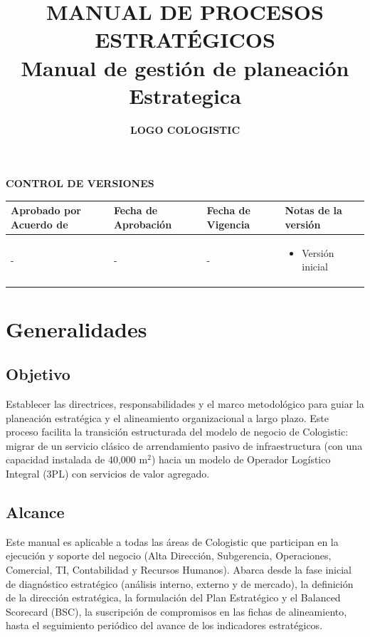 \documentclass[11pt,letterpaper]{report}
\title{\textbf{\large MANUAL DE PROCESOS ESTRATÉGICOS}\\[0.5em] \textbf{\Huge Manual de gestión de planeación Estrategica }}
\author{\textbf{LOGO COLOGISTIC}}
\date{}
\begin{document}
\maketitle

\begin{center}
\textbf{\large CONTROL DE VERSIONES}
\end{center}
\begin{tabularx}{\textwidth}{p{}p{}p{}X}
\toprule
\textbf{Aprobado por Acuerdo de} & \textbf{Fecha de Aprobación} & \textbf{Fecha de Vigencia} & \textbf{Notas de la versión} \\
\midrule
- & - & - & \begin{itemize} \item Versión inicial \end{itemize} \\
\bottomrule
\end{tabularx}

\newpage

\tableofcontents

\newpage

\chapter{Generalidades}

\section{Objetivo}
Establecer las directrices, responsabilidades y el marco metodológico para guiar la planeación estratégica y el alineamiento organizacional a largo plazo. Este proceso facilita la transición estructurada del modelo de negocio de Cologistic: migrar de un servicio clásico de arrendamiento pasivo de infraestructura (con una capacidad instalada de 40,000 m$^2$) hacia un modelo de Operador Logístico Integral (3PL) con servicios de valor agregado.

\section{Alcance}
Este manual es aplicable a todas las áreas de Cologistic que participan en la ejecución y soporte del negocio (Alta Dirección, Subgerencia, Operaciones, Comercial, TI, Contabilidad y Recursos Humanos). Abarca desde la fase inicial de diagnóstico estratégico (análisis interno, externo y de mercado), la definición de la dirección estratégica, la formulación del Plan Estratégico y el Balanced Scorecard (BSC), la suscripción de compromisos en las fichas de alineamiento, hasta el seguimiento periódico del avance de los indicadores estratégicos.
\end{document}
